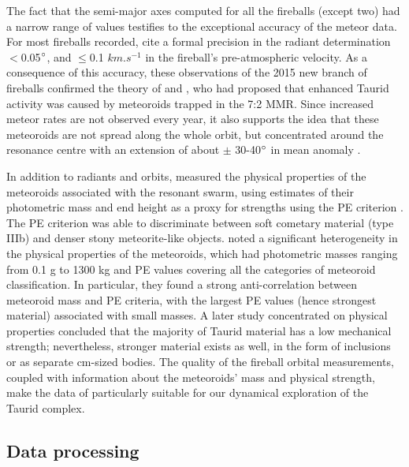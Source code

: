 \documentclass[letters,a4paper,fleqn,usenatbib]{mnras}
\begin{document}
 The fact that the semi-major axes computed for all the fireballs (except two) had a narrow range of values testifies to the exceptional accuracy of the meteor data. For most fireballs recorded, \cite{Spurny2017} cite a formal precision in the radiant determination $<$0.05$\degree$, and $\leq$0.1 $km.s^{-1}$ in the fireball's pre-atmospheric velocity. As a consequence of this accuracy, these observations of the 2015 new branch of fireballs confirmed the theory of \cite{Asher1993b} and \cite{Asher1998}, who had proposed that enhanced Taurid activity was caused by meteoroids trapped in the 7:2 MMR. Since increased meteor rates are not observed every year, it also supports the idea that these meteoroids are not spread along the whole orbit, but concentrated around the resonance centre with an extension of about $\pm$ 30-40$\degree$ in mean anomaly \citep{Asher1993b,Asher1998}.  
 
 In addition to radiants and orbits, \cite{Spurny2017} measured the physical properties of the meteoroids associated with the resonant swarm, using estimates of their photometric mass and end height as a proxy for strengths using the PE criterion \citep{Ceplecha1976}. The PE criterion was able to discriminate between soft cometary material (type IIIb) and denser stony meteorite-like \citep[type I, see][]{Ceplecha1988} objects. \cite{Spurny2017} noted a significant heterogeneity in the physical properties of the meteoroids, which had photometric masses ranging from 0.1 g to 1300 kg and PE values covering all the categories of meteoroid classification. In particular, they found a strong anti-correlation between meteoroid mass and PE criteria, with the largest PE values (hence strongest material) associated with small masses. A later study concentrated on physical properties \citep{Borovicka2020} concluded that the majority of Taurid material has a low mechanical strength; nevertheless, stronger material exists as well, in the form of inclusions or as separate cm-sized bodies. The quality of the fireball orbital measurements, coupled with information about the meteoroids' mass and physical strength, make the data of \cite{Spurny2017} particularly suitable for our dynamical exploration of the Taurid complex. 

 \subsection{Data processing} \label{sec:fireball_data}
 
\end{document}
